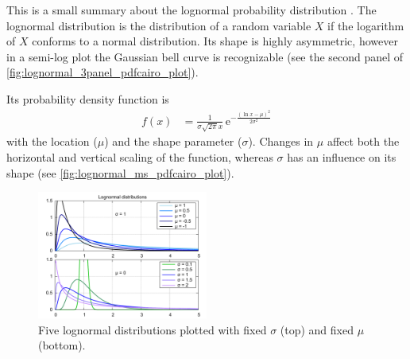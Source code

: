 This is a small summary about the lognormal probability distribution \citep[p.~780]{Bronstein2000}. The lognormal distribution is the distribution of a random variable $X$ if the logarithm of $X$ conforms to a normal distribution. Its shape is highly asymmetric, however in a semi-log plot the Gaussian bell curve is recognizable (see the second panel of \autoref{fig:lognormal_3panel_pdfcairo_plot}).
\begin{figure}[htb]
\end{figure}
Its probability density function is
\begin{align}
	f(x) &= \frac{1}{\sigma \sqrt{2 \pi} x} \, \text{e}^{- \frac{(\ln x - \mu)^2}{2 \sigma^2}}
\end{align}
with the location ($\mu$) and the shape parameter ($\sigma$). Changes in $\mu$ affect both the horizontal and vertical scaling of the function, whereas $\sigma$ has an influence on its shape (see \autoref{fig:lognormal_ms_pdfcairo_plot}).\\
\begin{figure}[htb]
	\centering
	\includegraphics[width=0.5\textwidth]{images/gnuplots/lognormal_ms_pdfcairo_plot.pdf}
	\caption{Five lognormal distributions plotted with fixed $\sigma$ (top) and fixed $\mu$ (bottom).}
	\label{fig:lognormal_ms_pdfcairo_plot}
\end{figure}


